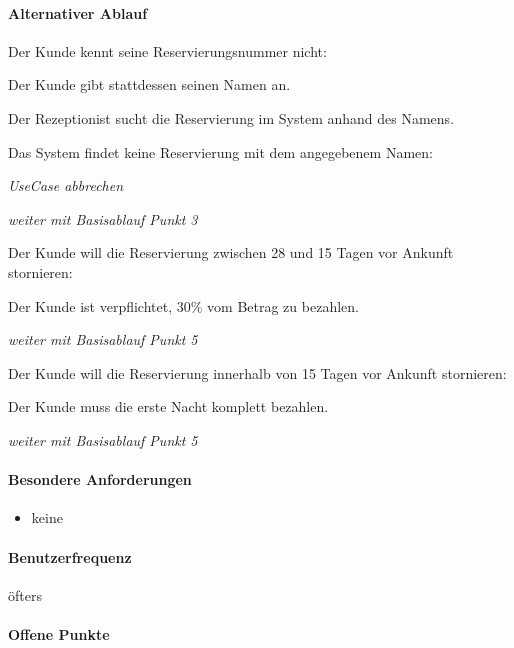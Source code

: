 \paragraph{Alternativer Ablauf}
\begin{longenum}
	\item
	\begin{longenum}
		\item Der \Gls{Kunde} kennt seine \Gls{Reservierungsnummer} nicht:
		\begin{longenum}
			\item Der \Gls{Kunde} gibt stattdessen seinen Namen an.
			\item Der \Gls{Rezeptionist} sucht die \Gls{Reservierung} im System anhand des Namens.
			\begin{longenum}
				\item Das System findet keine \Gls{Reservierung} mit dem angegebenem Namen:
				\begin{longenum}
					\item \emph{UseCase abbrechen}
				\end{longenum}
			\end{longenum}
			\item \emph{weiter mit Basisablauf Punkt 3}
		\end{longenum}
	\end{longenum}
	
	\item
	\item
	\item
	\begin{longenum}
		\item Der \Gls{Kunde} will die \Gls{Reservierung} zwischen 28 und 15 Tagen vor Ankunft stornieren:
		\begin{longenum}
			\item Der \Gls{Kunde} ist verpflichtet, 30\% vom Betrag zu bezahlen.
			\item \emph{weiter mit Basisablauf Punkt 5}
		\end{longenum}
		\item Der \Gls{Kunde} will die \Gls{Reservierung} innerhalb von 15 Tagen vor Ankunft stornieren:
		\begin{longenum}
			\item Der \Gls{Kunde} muss die erste Nacht komplett bezahlen.
			\item \emph{weiter mit Basisablauf Punkt 5}
		\end{longenum}
	\end{longenum}
	
	\item
\end{longenum}

\paragraph{Besondere Anforderungen}
\begin{itemize}
	\item keine
\end{itemize}

\paragraph{Benutzerfrequenz}
öfters

\paragraph{Offene Punkte}

\newpage
